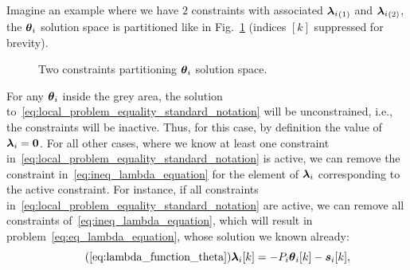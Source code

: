 \documentclass[../main.tex]{subfiles}
\begin{document}
Imagine an example where we have $2$ constraints with associated $\elem[1]{\lambdai}$ and $\elem[2]{\lambdai}$, the $\thetai$ solution space is partitioned like in Fig.~\ref{fig:constraints_partition_theta} (indices $[k]$ suppressed for brevity).
\begin{figure}[h]
  \centering
  \caption{Two constraints partitioning $\thetai$ solution space.}\label{fig:constraints_partition_theta}
\end{figure}

For any $\thetai$ inside the grey area, the solution to~\eqref{eq:local_problem_equality_standard_notation} will be unconstrained, i.e., the constraints will be inactive.
Thus, for this case, by definition the value of $\lambdai=\0$.
For all other cases, where we know at least one constraint in~\eqref{eq:local_problem_equality_standard_notation} is active, we can remove the constraint in~\eqref{eq:ineq_lambda_equation} for the element of $\lambdai$ corresponding to the active constraint.
For instance, if all constraints in~\eqref{eq:local_problem_equality_standard_notation} are active, we can remove all constraints of~\eqref{eq:ineq_lambda_equation}, which will result in problem~\eqref{eq:eq_lambda_equation}, whose solution we known already:
\begin{equation}
  \label{eq:lambda_function_theta_reprise}
  \tag{\ref*{eq:lambda_function_theta}}
  \lambdaik=-\Plin\thetaik-\sik,
\end{equation}
\newcommand{\Plinineqnonzero}[1][\star]{\overset{#1}{\Plin}}
\newcommand{\sikineqnonzero}[1][\star]{\overset{#1}{\vec{s}_{i}}[k]}
\end{document}
